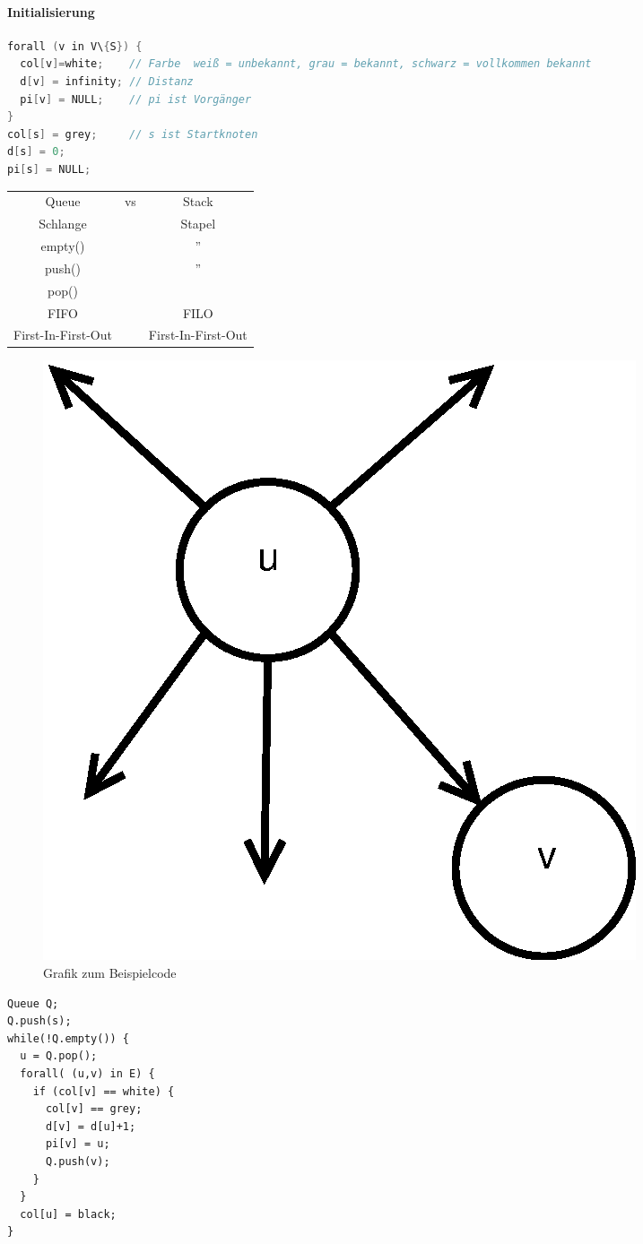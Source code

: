 \paragraph{Initialisierung}
\begin{lstlisting}[language=C, style = pseudo]
forall (v in V\{S}) {
  col[v]=white;    // Farbe  weiß = unbekannt, grau = bekannt, schwarz = vollkommen bekannt
  d[v] = infinity; // Distanz
  pi[v] = NULL;    // pi ist Vorgänger
}
col[s] = grey;     // s ist Startknoten
d[s] = 0;
pi[s] = NULL;
\end{lstlisting}
\begin{tabular}{ccc}
	Queue & vs & Stack \\
	Schlange &$~$& Stapel \\
	empty() &$~$ & '' \\
	push() &$~$ & '' \\
	pop() &$~$ &  \\
	FIFO &$~$ & FILO \\
	First-In-First-Out &$~$& First-In-First-Out 
\end{tabular}
\begin{figure}
	\includegraphics[width=\linewidth]{15/Grafik/CodeBild}
	\caption{Grafik zum Beispielcode}
	\label{fig:CodeBild}
\end{figure}
\begin{lstlisting}[style = pseudo]
Queue Q;
Q.push(s);
while(!Q.empty()) {
  u = Q.pop();
  forall( (u,v) in E) {
    if (col[v] == white) {
      col[v] == grey;
      d[v] = d[u]+1;
      pi[v] = u;
      Q.push(v);
    }
  }
  col[u] = black;
}
\end{lstlisting}

